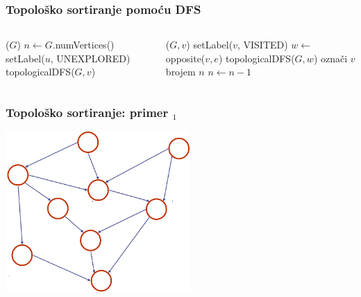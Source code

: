 \documentclass[compress,aspectratio=169]{beamer}
\begin{document}
\begin{frame}[fragile]
  \frametitle{Topološko sortiranje pomoću DFS}
  {\small
  \begin{columns}
    \begin{column}[t]{6cm}
      \begin{algorithmic}
        \STATE {}($G$)
        \STATE $n \leftarrow G$.numVertices()
          \STATE setLabel($u$, {\scriptsize UNEXPLORED})
        \ENDFOR
            \STATE topologicalDFS($G,v$)
          \ENDIF
        \ENDFOR
      \end{algorithmic}
    \end{column}
    \begin{column}[t]{6cm}
      \begin{algorithmic}
        \STATE {}($G,v$)
        \STATE setLabel($v$, {\scriptsize VISITED})
          \STATE $w \leftarrow$ opposite($v,e$)
            \STATE {}
            \STATE topologicalDFS($G,w$) 
          \ELSE
            \STATE {}
            \STATE označi $v$ brojem $n$ 
          \ENDIF
        \ENDFOR{}
        \STATE $n \leftarrow n-1$
      \end{algorithmic}
    \end{column}
  \end{columns}
  }
\end{frame}

\begin{frame}[fragile]
  \frametitle{Topološko sortiranje: primer $_1$}
  \begin{center}
    \includegraphics[width=7cm]{asp-14-pic48.png}
  \end{center}
\end{frame}
\end{document}
